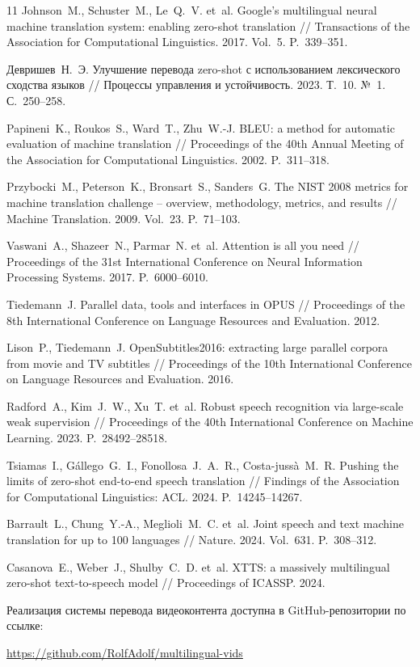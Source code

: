 \documentclass[a4paper,article,14pt]{extarticle}
\begin{document}
\begin{thebibliography}{11}
 Johnson~M., Schuster~M., Le~Q.~V. et~al. Google's multilingual neural machine translation system: enabling zero-shot translation // Transactions of the Association for Computational Linguistics. 2017. Vol.~5. P.~339--351.

 Девришев~Н.~Э. Улучшение перевода zero-shot с использованием лексического сходства языков // Процессы управления и устойчивость. 2023. Т.~10. №~1. С.~250--258.

 Papineni~K., Roukos~S., Ward~T., Zhu~W.-J. BLEU: a method for automatic evaluation of machine translation // Proceedings of the 40th Annual Meeting of the Association for Computational Linguistics. 2002. P.~311--318.

 Przybocki~M., Peterson~K., Bronsart~S., Sanders~G. The NIST 2008 metrics for machine translation challenge -- overview, methodology, metrics, and results // Machine Translation. 2009. Vol.~23. P.~71--103.

 Vaswani~A., Shazeer~N., Parmar~N. et~al. Attention is all you need // Proceedings of the 31st International Conference on Neural Information Processing Systems. 2017. P.~6000--6010.

 Tiedemann~J. Parallel data, tools and interfaces in OPUS // Proceedings of the 8th International Conference on Language Resources and Evaluation. 2012.

 Lison~P., Tiedemann~J. OpenSubtitles2016: extracting large parallel corpora from movie and TV subtitles // Proceedings of the 10th International Conference on Language Resources and Evaluation. 2016.

 Radford~A., Kim~J.~W., Xu~T. et~al. Robust speech recognition via large-scale weak supervision // Proceedings of the 40th International Conference on Machine Learning. 2023. P.~28492--28518.

 Tsiamas~I., G{\'a}llego~G.~I., Fonollosa~J.~A.~R., Costa-juss{\`a}~M.~R. Pushing the limits of zero-shot end-to-end speech translation // Findings of the Association for Computational Linguistics: ACL. 2024. P.~14245--14267.

 Barrault~L., Chung~Y.-A., Meglioli~M.~C. et~al. Joint speech and text machine translation for up to 100 languages // Nature. 2024. Vol.~631. P.~308--312.

 Casanova~E., Weber~J., Shulby~C.~D. et~al. XTTS: a massively multilingual zero-shot text-to-speech model // Proceedings of ICASSP. 2024.

\end{thebibliography}

\newpage


Реализация системы перевода видеоконтента доступна в GitHub-репозитории по ссылке:

\url{https://github.com/RolfAdolf/multilingual-vids}
\end{document}
